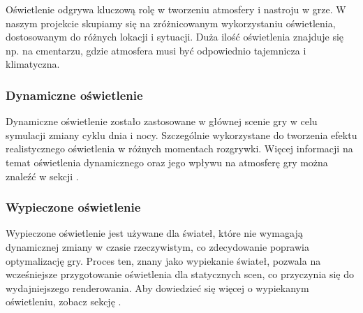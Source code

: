 Oświetlenie odgrywa kluczową rolę w tworzeniu atmosfery i nastroju w grze. W naszym projekcie skupiamy się na zróżnicowanym wykorzystaniu oświetlenia, dostosowanym do różnych lokacji i sytuacji. Duża ilość oświetlenia znajduje się np. na cmentarzu, gdzie atmosfera musi być odpowiednio tajemnicza i klimatyczna.

\subsubsection{Dynamiczne oświetlenie}
Dynamiczne oświetlenie zostało zastosowane w głównej scenie gry w celu symulacji zmiany cyklu dnia i nocy. Szczególnie wykorzystane do tworzenia efektu realistycznego oświetlenia w różnych momentach rozgrywki. Więcej informacji na temat oświetlenia dynamicznego oraz jego wpływu na atmosferę gry można znaleźć w sekcji .

\subsubsection{Wypieczone oświetlenie}
Wypieczone oświetlenie jest używane dla świateł, które nie wymagają dynamicznej zmiany w czasie rzeczywistym, co zdecydowanie poprawia optymalizację gry. Proces ten, znany jako wypiekanie świateł, pozwala na wcześniejsze przygotowanie oświetlenia dla statycznych scen, co przyczynia się do wydajniejszego renderowania. Aby dowiedzieć się więcej o wypiekanym oświetleniu, zobacz sekcję .
